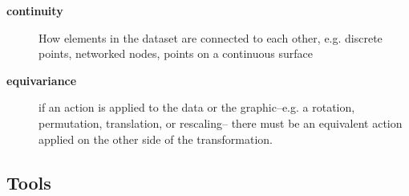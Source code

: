 \documentclass[../main.tex]{subfiles}
\begin{document}
\begin{mdframed}[roundcorner=10pt, frametitle=Structure, frametitlerule=true, frametitlebackgroundcolor=gray!10]
    \begin{description}
        \item[\textbf{continuity}] How elements in the dataset are connected to each other, e.g. discrete points, networked nodes, points on a continuous surface
        \item[\textbf{equivariance}] if an action is applied to the data or the graphic--e.g. a rotation, permutation, translation, or rescaling-- there must be an equivalent action applied on the other side of the transformation. 
    \end{description}
\end{mdframed}



\subsection{Tools}
\label{sec:intro:data:tools}
\end{document}
